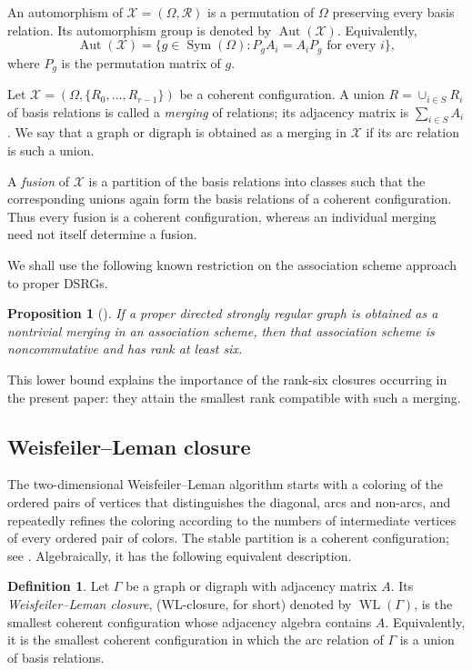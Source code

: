 \documentclass[11pt]{article}
\newtheorem{proposition}[theorem]{Proposition}
\theoremstyle{definition}
\newtheorem{definition}[theorem]{Definition}
\theoremstyle{remark}
\DeclareMathOperator{\Aut}{Aut}
\begin{document}
An automorphism of $\mathcal X=(\Omega,\mathcal R)$ is a permutation of
$\Omega$ preserving every basis relation.  Its automorphism group is denoted
by $\Aut(\mathcal X)$.  Equivalently,
\[ \Aut(\mathcal X) =\{g\in\operatorname{Sym}(\Omega):P_gA_i=A_iP_g
     \text{ for every }i\},\]
where $P_g$ is the permutation matrix of $g$.


Let $\mathcal X=(\Omega,\{R_0,\ldots,R_{r-1}\})$ be a coherent
configuration.  A union $ R=\cup_{i\in S}R_i$
of basis relations is called a \emph{merging} of relations; its adjacency
matrix is $\sum_{i\in S}A_i$.  We say that a graph or digraph is obtained as
a merging in $\mathcal X$ if its arc relation is such a union.

A \emph{fusion} of $\mathcal X$ is a partition of the basis relations into
classes such that the corresponding unions again form the basis relations of
a coherent configuration.  Thus every fusion is a coherent configuration,
whereas an individual merging need not itself determine a fusion. 

We shall use the following known restriction on the association scheme
approach to proper DSRGs.

\begin{proposition}[{\cite{fkp,kmmz}}]
\label{ranksix}
If a proper directed strongly regular graph is obtained as a nontrivial
merging in an association scheme, then that association scheme is
noncommutative and has rank at least six.
\end{proposition}

This lower bound explains the importance of the rank-six closures occurring
in the present paper: they attain the smallest rank compatible with such a
merging.


\subsection{Weisfeiler--Leman closure}

The two-dimensional Weisfeiler--Leman algorithm starts with a coloring of the
ordered pairs of vertices that distinguishes the diagonal, arcs and non-arcs,
and repeatedly refines the coloring according to the numbers of intermediate
vertices of every ordered pair of colors.  The stable partition is a coherent
configuration; see \cite{hi,wl}.  Algebraically, it
has the following equivalent description.

\begin{definition}
Let $\Gamma$ be a graph or digraph with adjacency matrix $A$.  Its
\emph{Weisfeiler--Leman closure}, (WL-closure, for short) 
denoted by $\operatorname{WL}(\Gamma)$, is
the smallest coherent configuration whose adjacency algebra contains $A$.
Equivalently, it is the smallest coherent configuration in which the arc
relation of $\Gamma$ is a union of basis relations.
\end{definition}
\end{document}
